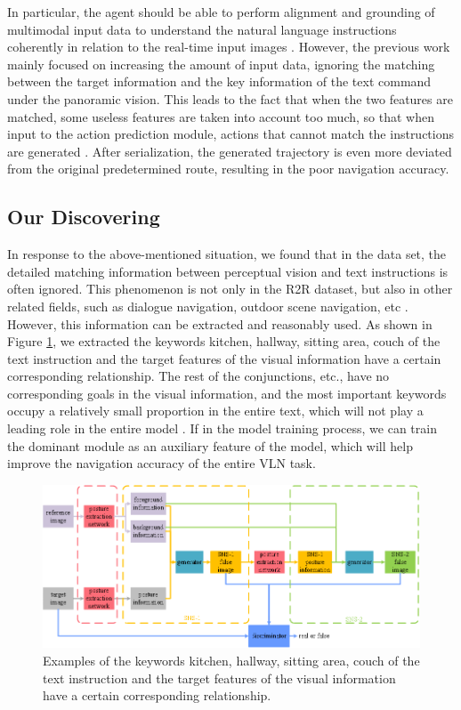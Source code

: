 In particular, the agent should be able to perform alignment and grounding of multimodal input data to understand the natural language instructions coherently in relation to the real-time input images \cite{qi2020object}. However, the previous work mainly focused on increasing the amount of input data, ignoring the matching between the target information and the key information of the text command under the panoramic vision. This leads to the fact that when the two features are matched, some useless features are taken into account too much, so that when input to the action prediction module, actions that cannot match the instructions are generated \cite{ma2019regretful}. After serialization, the generated trajectory is even more deviated from the original predetermined route, resulting in the poor navigation accuracy.
\vspace{-1em}
\subsection{Our Discovering}	

In response to the above-mentioned situation, we found that in the data set, the detailed matching information between perceptual vision and text instructions is often ignored. This phenomenon is not only in the R2R dataset, but also in other related fields, such as dialogue navigation, outdoor scene navigation, etc \cite{nguyen2019help,yan2019cross,chen2019touchdown}. However, this information can be extracted and reasonably used. As shown in Figure \ref{image02}, we extracted the keywords kitchen, hallway, sitting area, couch of the text instruction and the target features of the visual information have a certain corresponding relationship. The rest of the conjunctions, etc., have no corresponding goals in the visual information, and the most important keywords occupy a relatively small proportion in the entire text, which will not play a leading role in the entire model \cite{hao2020towards}. If in the model training process, we can train the dominant module as an auxiliary feature of the model, which will help improve the navigation accuracy of the entire VLN task.

\begin{figure}[h]
	\centering
	\includegraphics[scale=1]{image02.png}
	\caption{Examples of the keywords kitchen, hallway, sitting area, couch of the text instruction and the target features of the visual information have a certain corresponding relationship.}
	\label{image02}
	\vspace{-2em}
\end{figure}

